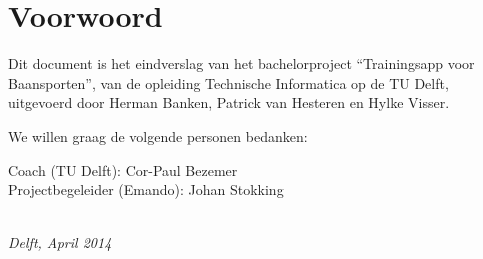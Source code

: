 \chapter*{Voorwoord}

Dit document is het eindverslag van het bachelorproject ``Trainingsapp voor Baansporten'', van de opleiding Technische Informatica op de TU Delft, uitgevoerd door Herman Banken, Patrick van Hesteren en Hylke Visser.

\bigskip

\noindent We willen graag de volgende personen bedanken:

\medskip

\noindent
Coach (TU Delft): Cor-Paul Bezemer\\
Projectbegeleider (Emando): Johan Stokking

\begin{flushright}
{\makeatletter\itshape
    \@author \\
    Delft, April 2014
\makeatother}
\end{flushright}